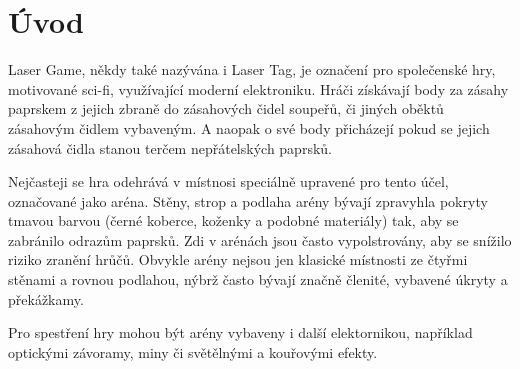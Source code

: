 \chapter*{Úvod}
{}

Laser Game, někdy také nazývána i Laser Tag, je označení pro společenské hry, motivované sci-fi, využívající moderní elektroniku. Hráči získávají body za zásahy  paprskem z jejich zbraně do zásahových čidel soupeřů, či jiných oběktů zásahovým čidlem vybaveným. A naopak o své body přicházejí pokud se jejich zásahová čidla stanou terčem nepřátelských  paprsků.

Nejčasteji se hra odehrává v místnosi speciálně upravené pro tento účel, označované jako aréna. Stěny, strop a podlaha arény bývají zpravyhla pokryty tmavou barvou (černé koberce, koženky a podobné materiály) tak, aby se zabránilo odrazům  paprsků. Zdi v arénách jsou často vypolstrovány, aby se snížilo riziko zranění hrůčů. Obvykle arény nejsou jen klasické místnosti ze čtyřmi stěnami a rovnou podlahou, nýbrž často bývají značně členité, vybavené úkryty a překážkamy.

Pro spestření hry mohou být arény vybaveny i další elektornikou, například optickými závoramy, miny či světělnými a kouřovými efekty.
